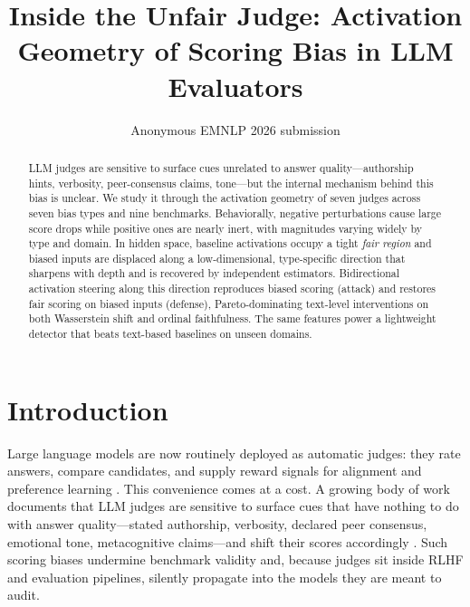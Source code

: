 \documentclass[11pt]{article}
\title{Inside the Unfair Judge: Activation Geometry of Scoring Bias in LLM Evaluators}
\author{Anonymous EMNLP 2026 submission}
\begin{document}
\maketitle

\begin{abstract}
LLM judges are sensitive to surface cues unrelated to answer quality---authorship hints, verbosity, peer-consensus claims, tone---but the internal mechanism behind this bias is unclear. We study it through the activation geometry of seven judges across seven bias types and nine benchmarks. Behaviorally, negative perturbations cause large score drops while positive ones are nearly inert, with magnitudes varying widely by type and domain. In hidden space, baseline activations occupy a tight \emph{fair region} and biased inputs are displaced along a low-dimensional, type-specific direction that sharpens with depth and is recovered by independent estimators. Bidirectional activation steering along this direction reproduces biased scoring (attack) and restores fair scoring on biased inputs (defense), Pareto-dominating text-level interventions on both Wasserstein shift and ordinal faithfulness. The same features power a lightweight detector that beats text-based baselines on unseen domains.
\end{abstract}

\section{Introduction}
\label{sec:intro}

Large language models are now routinely deployed as automatic judges: they rate answers, compare candidates, and supply reward signals for alignment and preference learning \citep{zheng2023judging,liu2023geval,gu2024survey,li2024llmsjudges}. This convenience comes at a cost. A growing body of work documents that LLM judges are sensitive to surface cues that have nothing to do with answer quality---stated authorship, verbosity, declared peer consensus, emotional tone, metacognitive claims---and shift their scores accordingly \citep{wang2023large,saito2023verbosity,panickssery2024llm,li2024split,koo2024benchmarking}. Such scoring biases undermine benchmark validity and, because judges sit inside RLHF and evaluation pipelines, silently propagate into the models they are meant to audit.
\end{document}
